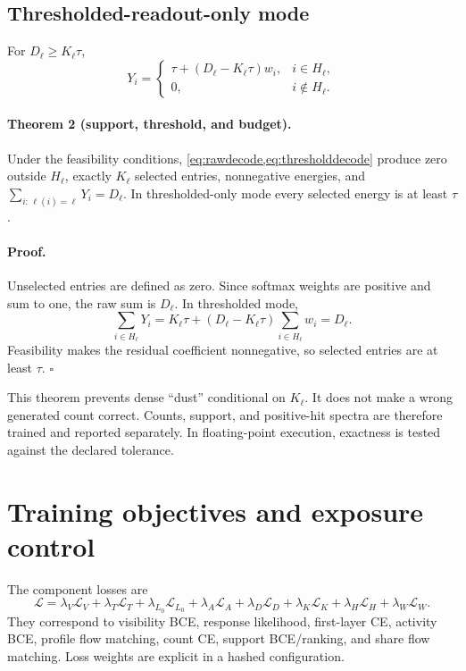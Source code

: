 \documentclass[10pt,a4paper]{article}
\begin{document}
\subsection{Thresholded-readout-only mode}
For $D_\ell\ge K_\ell\tau$,
\begin{equation}
 Y_i=\begin{cases}\tau+(D_\ell-K_\ell\tau)w_i,&i\in H_\ell,\\0,&i\notin H_\ell.\end{cases}
 \label{eq:thresholddecode}
\end{equation}

\paragraph{Theorem 2 (support, threshold, and budget).}
Under the feasibility conditions, \cref{eq:rawdecode,eq:thresholddecode} produce zero outside $H_\ell$, exactly $K_\ell$ selected entries, nonnegative energies, and $\sum_{i:\,\ell(i)=\ell}Y_i=D_\ell$. In thresholded-only mode every selected energy is at least $\tau$.

\paragraph{Proof.}
Unselected entries are defined as zero. Since softmax weights are positive and sum to one, the raw sum is $D_\ell$. In thresholded mode,
\[
 \sum_{i\in H_\ell}Y_i=K_\ell\tau+(D_\ell-K_\ell\tau)\sum_{i\in H_\ell}w_i=D_\ell.
\]
Feasibility makes the residual coefficient nonnegative, so selected entries are at least $\tau$. \hfill$\square$

This theorem prevents dense ``dust'' conditional on $K_\ell$. It does not make a wrong generated count correct. Counts, support, and positive-hit spectra are therefore trained and reported separately. In floating-point execution, exactness is tested against the declared tolerance.

\section{Training objectives and exposure control}

The component losses are
\begin{equation}
\mathcal L=
\lambda_V\mathcal L_V+
\lambda_T\mathcal L_T+
\lambda_{L_0}\mathcal L_{L_0}+
\lambda_A\mathcal L_A+
\lambda_D\mathcal L_D+
\lambda_K\mathcal L_K+
\lambda_H\mathcal L_H+
\lambda_W\mathcal L_W.
\end{equation}
They correspond to visibility BCE, response likelihood, first-layer CE, activity BCE, profile flow matching, count CE, support BCE/ranking, and share flow matching. Loss weights are explicit in a hashed configuration.
\end{document}
